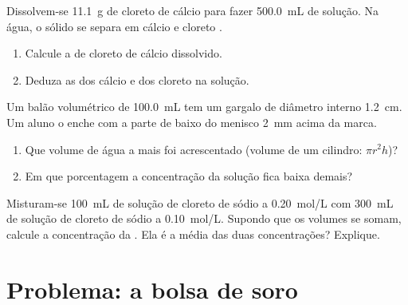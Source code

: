 \begin{exercise}[$\star\star\star$]\label{exo:g10:concentration-and-dilution:13}
Dissolvem-se \qty{11.1}{g} de cloreto de cálcio  para fazer
\qty{500.0}{mL} de solução. Na água, o sólido se separa em  cálcio
 e  cloreto .
\begin{enumerate}
  \item Calcule a  de cloreto de cálcio dissolvido.
  \item Deduza as  dos  cálcio e dos 
        cloreto na solução.
\end{enumerate}
\end{exercise}

\begin{exercise}[$\star\star\star$]\label{exo:g10:concentration-and-dilution:14}
Um balão volumétrico de \qty{100.0}{mL} tem um gargalo de diâmetro
interno \qty{1.2}{cm}. Um aluno o enche com a parte de baixo do menisco
\qty{2}{mm} acima da marca.
\begin{enumerate}
  \item Que volume de água a mais foi acrescentado (volume de um
        cilindro: $\pi r^2 h$)?
  \item Em que porcentagem a concentração da solução fica baixa demais?
\end{enumerate}
\end{exercise}

\begin{exercise}[$\star\star\star$]\label{exo:g10:concentration-and-dilution:15}
Misturam-se \qty{100}{mL} de solução de cloreto de sódio a
\qty{0.20}{mol/L} com \qty{300}{mL} de solução de cloreto de sódio a
\qty{0.10}{mol/L}. Supondo que os volumes se somam, calcule a
concentração da . Ela é a média das duas concentrações?
Explique.
\end{exercise}

\section{Problema: a bolsa de soro}

